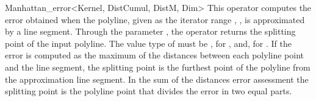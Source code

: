 \begin{ccRefClass}{Manhattan_error<Kernel, DistCumul, DistM, Dim>}
{This operator computes the error obtained when the polyline, given as the iterator range , ,
is approximated by a line segment. Through the parameter , the operator returns the 
splitting point of the input polyline.  The value type of  must be , for ,
and, for .
If the error is computed as the maximum of the distances between each
polyline point and the line segment, the splitting point is the furthest
point of the polyline from the approximation line segment. In the sum of
the distances error assessment the splitting point is the polyline point
that divides the error in two equal parts. }


\ccSeeAlso


\end{ccRefClass}

